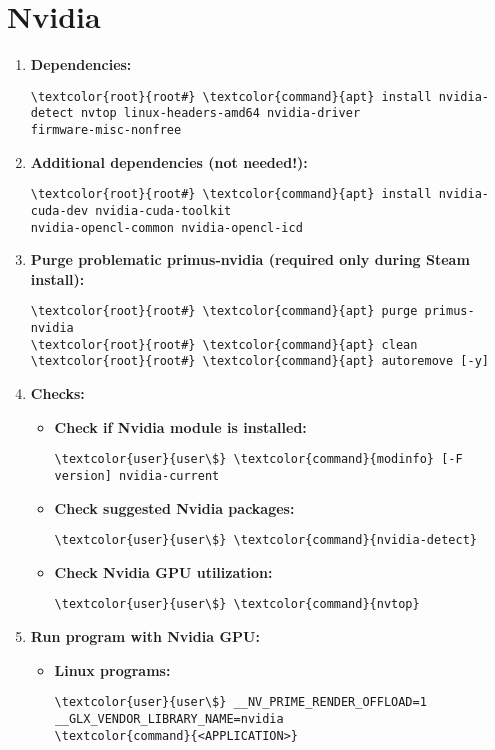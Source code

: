 \documentclass[10pt, a4paper, onecolumn, openany]{book} %
\begin{document}
\section{Nvidia}
\begin{enumerate}
    \item \textbf{Dependencies:}
\begin{Verbatim}[commandchars=\\\{\}]
\textcolor{root}{root#} \textcolor{command}{apt} install nvidia-detect nvtop linux-headers-amd64 nvidia-driver 
firmware-misc-nonfree
\end{Verbatim}    
    \item \textbf{Additional dependencies (\textbf{not needed!}):}
\begin{Verbatim}[commandchars=\\\{\}]
\textcolor{root}{root#} \textcolor{command}{apt} install nvidia-cuda-dev nvidia-cuda-toolkit 
nvidia-opencl-common nvidia-opencl-icd
\end{Verbatim}
    \item \textbf{Purge problematic primus-nvidia (required only during Steam install):}
\begin{Verbatim}[commandchars=\\\{\}]
\textcolor{root}{root#} \textcolor{command}{apt} purge primus-nvidia
\textcolor{root}{root#} \textcolor{command}{apt} clean
\textcolor{root}{root#} \textcolor{command}{apt} autoremove [-y]
\end{Verbatim}
    \item \textbf{Checks:}
\begin{itemize}
    \item \textbf{Check if Nvidia module is installed:}
\begin{Verbatim}[commandchars=\\\{\}]
\textcolor{user}{user\$} \textcolor{command}{modinfo} [-F version] nvidia-current
\end{Verbatim}
    \item \textbf{Check suggested Nvidia packages:}
\begin{Verbatim}[commandchars=\\\{\}]
\textcolor{user}{user\$} \textcolor{command}{nvidia-detect}
\end{Verbatim}
    \item \textbf{Check Nvidia GPU utilization:}
\begin{Verbatim}[commandchars=\\\{\}]
\textcolor{user}{user\$} \textcolor{command}{nvtop}
\end{Verbatim}
\end{itemize}
    \item \textbf{Run program with Nvidia GPU:}
\begin{itemize}
    \item \textbf{Linux programs:}
\begin{Verbatim}[commandchars=\\\{\}]
\textcolor{user}{user\$} __NV_PRIME_RENDER_OFFLOAD=1 __GLX_VENDOR_LIBRARY_NAME=nvidia 
\textcolor{command}{<APPLICATION>}
\end{Verbatim}
\end{itemize}
\end{enumerate}
\end{document}
